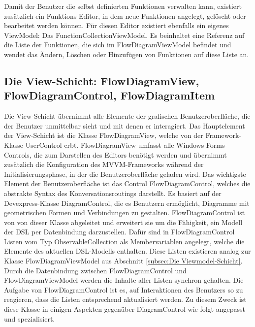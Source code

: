 \newline
Damit der Benutzer die selbst definierten Funktionen verwalten kann, existiert zusätzlich ein Funktions-Editor, in dem neue Funktionen angelegt, gelöscht oder bearbeitet werden können. Für diesen Editor existiert ebenfalls ein eigenes ViewModel: Das FunctionCollectionViewModel. Es beinhaltet eine Referenz auf die Liste der Funktionen, die sich im FlowDiagramViewModel befindet und wendet das Ändern, Löschen oder Hinzufügen von Funktionen auf diese Liste an.


\subsection{Die View-Schicht: FlowDiagramView, FlowDiagramControl, FlowDiagramItem}
Die View-Schicht übernimmt alle Elemente der grafischen Benutzeroberfläche, die der Benutzer unmittelbar sieht und mit denen er interagiert. Das Hauptelement der View-Schicht ist die Klasse FlowDiagramView, welche von der Framework-Klasse UserControl erbt. FlowDiagramView umfasst alle Windows Forms-Controls, die zum Darstellen des Editors benötigt werden und übernimmt zusätzlich die Konfiguration des MVVM-Frameworks während der Initialisierungsphase, in der die Benutzeroberfläche geladen wird.
\newline  
Das wichtigste Element der Benutzeroberfläche ist das Control FlowDiagramControl, welches  die abstrakte Syntax des Konversationsroutings darstellt. Es basiert auf der Devexpress-Klasse DiagramControl, die es Benutzern ermöglicht, Diagramme mit geometrischen Formen und Verbindungen zu gestalten. FlowDiagramControl ist von von dieser Klasse abgeleitet und erweitert sie um die Fähigkeit, ein Modell der DSL per Datenbindung darzustellen. Dafür sind in FlowDiagramControl Listen vom Typ ObservableCollection als Membervariablen angelegt, welche die Elemente des aktuellen DSL-Modells enthalten. Diese Listen existieren analog zur Klasse FlowDiagramViewModel aus Abschnitt \ref{subsec:Die Viewmodel-Schicht}. Durch die Datenbindung zwischen FlowDiagramControl und FlowDiagramViewModel werden die Inhalte aller Listen synchron gehalten. Die Aufgabe von FlowDiagramControl ist es, auf Interaktionen des Benutzers so zu reagieren, dass die Listen entsprechend aktualisiert werden. Zu diesem Zweck ist diese Klasse in einigen Aspekten gegenüber DiagramControl wie folgt angepasst und spezialisiert.
\newline
